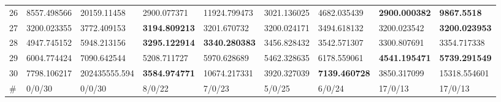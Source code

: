 \begin{table*}[t]
\begin{tabular}{|p{0.8cm}|p{1.6cm}|p{1.6cm}|p{1.6cm}|p{1.6cm}|p{1.6cm}|p{1.6cm}|p{1.6cm}|p{1.6cm}|}
26  & 8557.498566 & 20159.11458 & 2900.077371 & 11924.799473 & 3021.136025 & 4682.035439 & \textbf{2900.000382} & \textbf{9867.5518} \\ 
27  & 3200.023355 & 3772.409153 & \textbf{3194.809213} & 3201.670732 & 3200.024171 & 3494.618132 & 3200.023542 & \textbf{3200.023953} \\ 
28  & 4947.745152 & 5948.213156 & \textbf{3295.122914} & \textbf{3340.280383} & 3456.828432 & 3542.571307 & 3300.807691 & 3354.717338 \\ 
29  & 6004.774424 & 7090.642544 & 5208.711727 & 5970.628689 & 5462.328635 & 6178.559061 & \textbf{4541.195471} & \textbf{5739.291549} \\ 
30  & 7798.106217 & 202435555.594 & \textbf{3584.974771} & 10674.217331 & 3920.327039 & \textbf{7139.460728} & 3850.317099 & 15318.554601 \\ 
\hline
\#  & 0/0/30 & 0/0/30 & 8/0/22 & 7/0/23 & 5/0/25 & 6/0/24 & 17/0/13 & 17/0/13 \\
\hline

 \end{tabular}
\end{table*}
\endgroup
